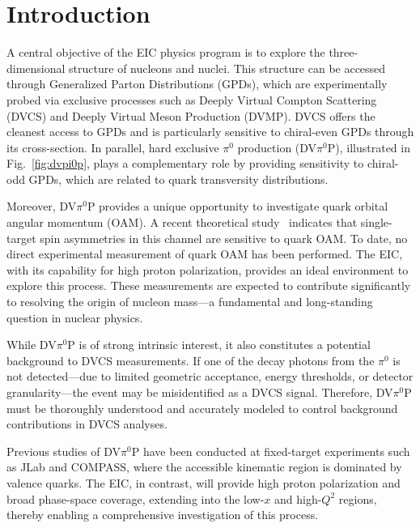 \documentclass[letterpaper,12pt]{article}
\begin{document}
\tableofcontents

\pagebreak
{}

\section{Introduction}\label{sec:Intro}
A central objective of the EIC physics program is to explore the three-dimensional structure of nucleons and nuclei. This structure can be accessed through Generalized Parton Distributions (GPDs), which are experimentally probed via exclusive processes such as Deeply Virtual Compton Scattering (DVCS) and Deeply Virtual Meson Production (DVMP). DVCS offers the cleanest access to GPDs and is particularly sensitive to chiral-even GPDs through its cross-section. In parallel, hard exclusive $\pi^0$ production (DV$\pi^{0}$P), illustrated in Fig.~\ref{fig:dvpi0p}, plays a complementary role by providing sensitivity to chiral-odd GPDs, which are related to quark transversity distributions. 

Moreover, DV$\pi^{0}$P provides a unique opportunity to investigate quark orbital angular momentum (OAM). A recent theoretical study~\cite{PhysRevLett.133.051901} indicates that single-target spin asymmetries in this channel are sensitive to quark OAM. To date, no direct experimental measurement of quark OAM has been performed. The EIC, with its capability for high proton polarization, provides an ideal environment to explore this process. These measurements are expected to contribute significantly to resolving the origin of nucleon mass—a fundamental and long-standing question in nuclear physics.

While DV$\pi^{0}$P is of strong intrinsic interest, it also constitutes a potential background to DVCS measurements. If one of the decay photons from the $\pi^0$ is not detected—due to limited geometric acceptance, energy thresholds, or detector granularity—the event may be misidentified as a DVCS signal. Therefore, DV$\pi^{0}$P must be thoroughly understood and accurately modeled to control background contributions in DVCS analyses.

Previous studies of DV$\pi^{0}$P have been conducted at fixed-target experiments such as JLab and COMPASS, where the accessible kinematic region is dominated by valence quarks. The EIC, in contrast, will provide high proton polarization and broad phase-space coverage, extending into the low-$x$ and high-$Q^2$ regions, thereby enabling a comprehensive investigation of this process.
\end{document}
